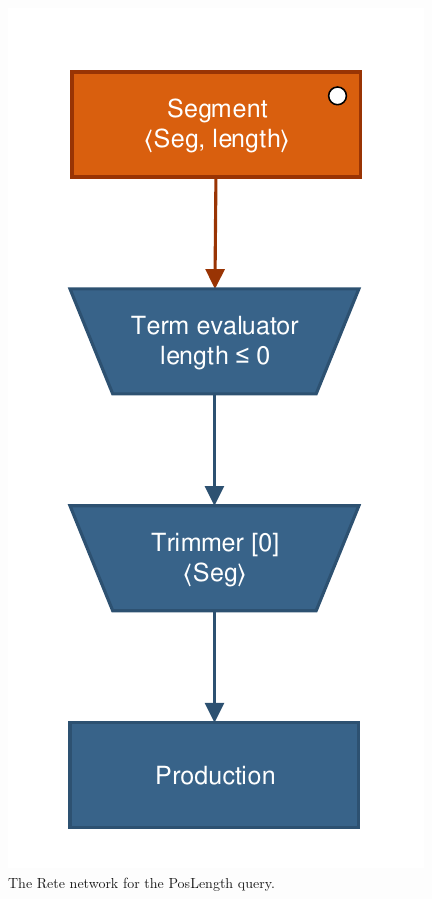 \begin{figure}[htb]
\centering
\begin{minipage}[b]{0.4\textwidth}
\begin{center}
\includegraphics[scale=0.5]{figures/rete-poslength-layout.pdf}
\caption{The Rete network for the \textsf{PosLength} query.}
\label{fig:rete-poslength-layout}
\end{center}
\end{minipage}
\qquad
\begin{minipage}[b]{0.4\textwidth}
\begin{center}

\end{center}
\end{minipage}
\end{figure}
